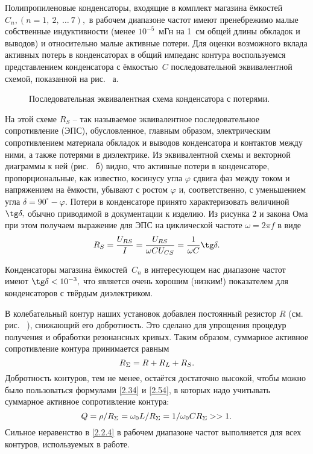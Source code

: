 Полипропиленовые конденсаторы, входящие в комплект магазина ёмкостей  $C_n,(n=1,~2,~\ldots~7),$ в рабочем диапазоне частот имеют пренебрежимо малые собственные индуктивности (менее $10^{-5}$~мГн на 1~см общей длины обкладок и выводов) и относительно малые активные потери. Для оценки возможного вклада активных потерь в конденсаторах в общий импеданс контура воспользуемся представлением конденсатора с ёмкостью~$C$ последовательной эквивалентной схемой, показанной на рис. ~а.
\begin{figure}[h!]
	\caption{Последовательная эквивалентная схема конденсатора с потерями.}
\end{figure}
На этой схеме $R_S$ – так называемое эквивалентное последовательное сопротивление (ЭПС), обусловленное, главным образом, электрическим сопротивлением материала обкладок и выводов конденсатора и контактов между ними, а также потерями в диэлектрике. Из эквивалентной схемы и векторной диаграммы к ней (рис. ~б) видно, что активные потери в конденсаторе, пропорциональные, как известно, косинусу угла $\varphi$ сдвига фаз между током и напряжением на ёмкости, убывают с ростом $\varphi$ и, соответственно, с уменьшением угла $\delta=90^{\circ}-\varphi.$ Потери в конденсаторе принято характеризовать величиной $\tg\delta,$ обычно приводимой в документации к изделию. Из рисунка 2 и закона Ома при этом получаем выражение для ЭПС на циклической частоте $\omega=2\pi f$ в виде
\begin{equation}\eqmark{2.2.1}
	R_S=\dfrac{U_{RS}}{I}=\dfrac{U_{RS}}{\omega CU_{CS}}=\dfrac{1}{\omega C}\tg\delta.
\end{equation}

Конденсаторы магазина ёмкостей~$C_n$ в интересующем нас диапазоне частот имеют $\tg\delta<10^{-3},$ что является очень хорошим (низким!) показателем для конденсаторов с твёрдым диэлектриком.

В колебательный контур наших установок добавлен постоянный резистор $R$ (см. рис. ~), снижающий его добротность. Это сделано для упрощения процедур получения и обработки резонансных кривых. Таким образом, суммарное активное сопротивление контура принимается равным
\begin{equation}\eqmark{2.2.2}
	R_{\Sigma}=R+R_L+R_S.
\end{equation}
Добротность контуров, тем не менее, остаётся достаточно высокой, чтобы можно было пользоваться формулами \eqref{2.34} и \eqref{2.54}, в которых надо учитывать суммарное активное сопротивление контура:
\begin{equation}\eqmark{2.2.3}
	Q=\rho/R_{\Sigma}=\omega_0L/R_{\Sigma}=1/\omega_0CR_{\Sigma}>>1.
\end{equation}
Сильное неравенство в \eqref{2.2.4} в рабочем диапазоне частот выполняется для всех контуров, используемых в работе.

